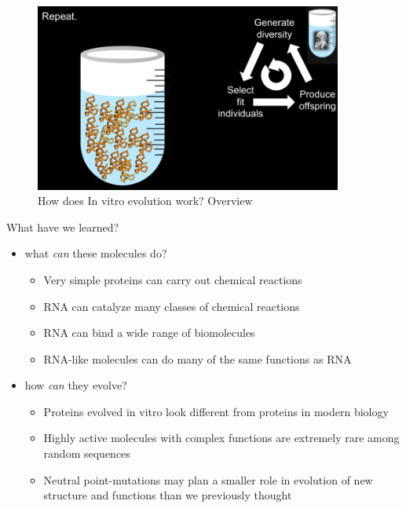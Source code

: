\documentclass[]{article}
\begin{document}
\begin{figure}[H]
	\caption{How does In vitro evolution work? Overview}\label{fig:InVitroEvolutionRepeat}
	\includegraphics[width=0.9\textwidth]{InVitroEvolutionRepeat}
\end{figure}

What have we learned?
\begin{itemize}
	\item what \textit{can} these molecules do?
	\begin{itemize}
		\item Very simple proteins can carry out chemical reactions\cite{seelig2007selection}
		\item RNA can catalyze many classes of chemical reactions\cite{chen2007ribozyme}
		\item RNA can bind a wide range of biomolecules\cite{gold2012aptamers}
		\item RNA-like molecules can do many of the same functions as RNA\cite{sefah2014vitro,pinheiro2012synthetic}
	\end{itemize}
	\item how \textit{can} they evolve?
		\begin{itemize}
		\item Proteins evolved in vitro look different from proteins in modern biology\cite{mansy2007structure}
		\item Highly active molecules with complex functions are extremely rare among random sequences \cite{bartel1993isolation}
		\item Neutral point-mutations may plan a smaller role in evolution of new structure and functions than we previously thought\cite{petrie2014limits,pressman2019mapping}
	\end{itemize}
\end{itemize}
\end{document}
